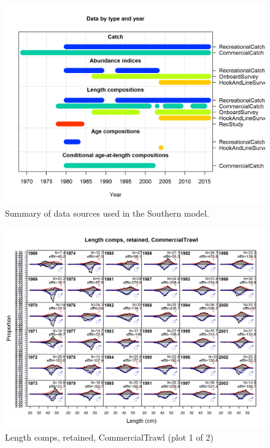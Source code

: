 \documentclass[12pt,]{article}
\begin{document}
\begin{figure}[htbp]
\centering
\includegraphics{r4ss/plots_mod2/data_plot.png}
\caption{Summary of data sources used in the Southern model.
\label{fig:data_plot}}
\end{figure}

\FloatBarrier

\FloatBarrier

\FloatBarrier

\FloatBarrier

\FloatBarrier

\FloatBarrier

\begin{figure}[htbp]
\centering
\includegraphics{./r4ss/plots_mod1/comp_lenfit_flt1mkt2_page1.png}
\caption{Length comps, retained, CommercialTrawl (plot 1 of 2)
\label{fig:mod1_1_comp_lenfit_flt1mkt2_page1}}
\end{figure}
\end{document}
